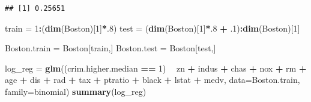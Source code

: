 \documentclass[]{article}
\newenvironment{Shaded}{\begin{snugshade}}{\end{snugshade}}
\newcommand{\KeywordTok}[1]{\textcolor[rgb]{0.13,0.29,0.53}{\textbf{#1}}}
\newcommand{\DataTypeTok}[1]{\textcolor[rgb]{0.13,0.29,0.53}{#1}}
\newcommand{\DecValTok}[1]{\textcolor[rgb]{0.00,0.00,0.81}{#1}}
\newcommand{\StringTok}[1]{\textcolor[rgb]{0.31,0.60,0.02}{#1}}
\newcommand{\OperatorTok}[1]{\textcolor[rgb]{0.81,0.36,0.00}{\textbf{#1}}}
\newcommand{\NormalTok}[1]{#1}
\begin{document}
\begin{Shaded}
\end{Shaded}

\begin{verbatim}
## [1] 0.25651
\end{verbatim}

\begin{Shaded}
\end{Shaded}

\begin{Shaded}
\begin{Highlighting}[]
\NormalTok{train =}\StringTok{ }\DecValTok{1}\OperatorTok{:}\NormalTok{(}\KeywordTok{dim}\NormalTok{(Boston)[}\DecValTok{1}\NormalTok{]}\OperatorTok{*}\NormalTok{.}\DecValTok{8}\NormalTok{)}
\NormalTok{test =}\StringTok{ }\NormalTok{(}\KeywordTok{dim}\NormalTok{(Boston)[}\DecValTok{1}\NormalTok{]}\OperatorTok{*}\NormalTok{.}\DecValTok{8} \OperatorTok{+}\StringTok{ }\NormalTok{.}\DecValTok{1}\NormalTok{)}\OperatorTok{:}\KeywordTok{dim}\NormalTok{(Boston)[}\DecValTok{1}\NormalTok{]}

\NormalTok{Boston.train =}\StringTok{ }\NormalTok{Boston[train,]}
\NormalTok{Boston.test =}\StringTok{ }\NormalTok{Boston[test,]}
\end{Highlighting}
\end{Shaded}

\begin{Shaded}
\begin{Highlighting}[]
\NormalTok{log_reg =}\StringTok{ }\KeywordTok{glm}\NormalTok{((crim.higher.median }\OperatorTok{==}\StringTok{ }\DecValTok{1}\NormalTok{) }\OperatorTok{~}\StringTok{ }\NormalTok{zn }\OperatorTok{+}\StringTok{ }\NormalTok{indus }\OperatorTok{+}\StringTok{ }\NormalTok{chas }\OperatorTok{+}\StringTok{ }\NormalTok{nox }\OperatorTok{+}\StringTok{ }\NormalTok{rm }\OperatorTok{+}\StringTok{ }\NormalTok{age }\OperatorTok{+}\StringTok{ }\NormalTok{dis }\OperatorTok{+}\StringTok{ }\NormalTok{rad }\OperatorTok{+}\StringTok{ }\NormalTok{tax }\OperatorTok{+}\StringTok{ }\NormalTok{ptratio }\OperatorTok{+}\StringTok{ }\NormalTok{black }\OperatorTok{+}\StringTok{ }\NormalTok{lstat }\OperatorTok{+}\StringTok{ }\NormalTok{medv, }\DataTypeTok{data=}\NormalTok{Boston.train, }\DataTypeTok{family=}\NormalTok{binomial)}
\KeywordTok{summary}\NormalTok{(log_reg)}
\end{Highlighting}
\end{Shaded}
\end{document}
